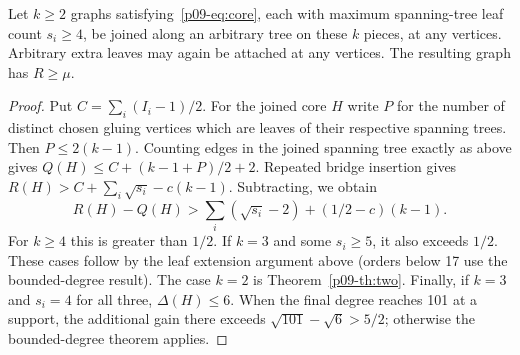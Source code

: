 \documentclass[11pt,a4paper]{article}
\begin{document}
\begin{corollary}
Let $k\ge2$ graphs satisfying~\eqref{p09-eq:core}, each with maximum
spanning-tree leaf count $s_i\ge4$, be joined along an arbitrary
tree on these $k$ pieces, at any vertices. Arbitrary extra leaves may
again be attached at any vertices. The resulting graph has $R\ge\mu$.
\end{corollary}
\begin{proof}
Put $C=\sum_i(I_i-1)/2$. For the joined core $H$ write $P$ for the
number of distinct chosen gluing vertices which are leaves of their
respective spanning trees. Then $P\le2(k-1)$. Counting edges in the
joined spanning tree exactly as above gives
$Q(H)\le C+(k-1+P)/2+2$. Repeated bridge insertion gives
$R(H)>C+\sum_i\sqrt{s_i}-c(k-1)$. Subtracting, we obtain
\[
 R(H)-Q(H)>\sum_i(\sqrt{s_i}-2)+(1/2-c)(k-1).
\]
For $k\ge4$ this is greater than $1/2$. If $k=3$ and some $s_i\ge5$,
it also exceeds $1/2$. These cases follow by the leaf extension argument
above (orders below 17 use the bounded-degree result).
The case $k=2$ is Theorem~\ref{p09-th:two}. Finally, if $k=3$ and
$s_i=4$ for all three, $\Delta(H)\le6$. When the final degree reaches
101 at a support, the additional gain there exceeds
$\sqrt{101}-\sqrt6>5/2$; otherwise the bounded-degree theorem applies.
\end{proof}
\end{document}
